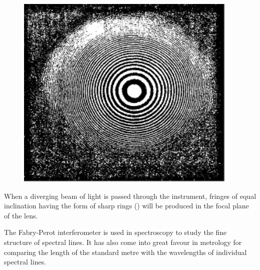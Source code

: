 \begin{figure}[t]
	\begin{center}
		\includegraphics[scale=0.9]{figures/ch_17/fig_17_22.pdf}
		\caption[]{}
		\label{fig:17_22}
	\end{center}
	\vspace{-0.8cm}
\end{figure}

When a diverging beam of light is passed through the instrument, fringes of equal inclination having the form of sharp rings () will be produced in the focal plane of the lens.

The Fabry-Perot interferometer is used in spectroscopy to study the fine structure of spectral lines.
It has also come into great favour in metrology for comparing the length of the standard metre with the wavelengths of individual spectral lines.
